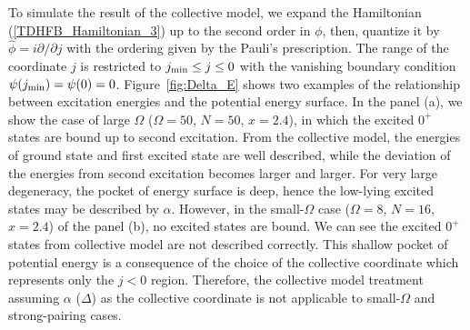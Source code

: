 \documentclass[%
superscriptaddress,
preprint,
showpacs,
nofootinbib,
amsmath,amssymb,
aps,
prc,
floatfix ]%
{revtex4-1}
\begin{document}
To simulate the result of the collective model, we expand the Hamiltonian
(\ref{TDHFB_Hamiltonian_3}) up to the second order in $\phi$,
then, quantize it by $\hat{\phi}=i\partial/\partial j$ with
the ordering given by the Pauli's prescription.
The range of the coordinate $j$ is restricted to $j_{\rm min}\leq j \leq 0$
with the vanishing boundary condition $\psi(j_{\rm min})=\psi(0)=0$.
Figure~\ref{fig:Delta_E} shows two examples of the relationship 
between excitation energies and the potential energy surface.
In the panel (a), we show the case of large $\Omega$
($\Omega=50$, $N=50$, $x=2.4$),
in which
the excited $0^+$ states are bound up to second excitation.
From the collective model, the energies of ground state and first excited state are
well described, while the deviation of the energies from second excitation
becomes larger and larger.
For very large degeneracy, the pocket of energy surface is deep, 
hence the low-lying excited states may be described by $\alpha$. 
However, in the small-$\Omega$ case ($\Omega=8$, $N=16$, $x=2.4$)
of the panel (b), no excited states are bound.
We can see the excited $0^+$ states from collective model 
are not described correctly.
This shallow pocket of potential energy is a consequence of the
choice of the collective coordinate
which represents only the $j<0$ region.
Therefore, the collective model treatment assuming
$\alpha$ ($\Delta$) as the collective coordinate
is not applicable to small-$\Omega$ and strong-pairing cases.

\end{document}
